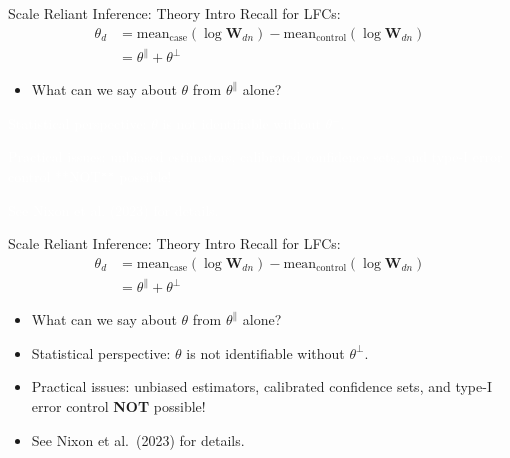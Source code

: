\documentclass[
  ignorenonframetext,
]{beamer}
\providecommand{\tightlist}{%
  \setlength{\itemsep}{0pt}\setlength{\parskip}{0pt}}
\begin{document}
\begin{frame}{Scale Reliant Inference: Theory Intro}
\protect\hypertarget{scale-reliant-inference-theory-intro}{}
Recall for LFCs: \begin{align*}
\theta_d &= \text{mean}_{\text{case}}(\log \mathbf{W}_{dn} ) - \text{mean}_{\text{control}}(\log \mathbf{W}_{dn} )\\
&= \theta^\parallel + \theta^\perp
\end{align*}

\begin{itemize}
\tightlist
\item
  What can we say about \(\theta\) from \(\theta^\parallel\) alone?
\end{itemize}

\textcolor{white}{Statistical perspective: $\theta$ is not identifiable without $\theta^\perp$.}

\textcolor{white}{Practical issues: unbiased estimators, calibrated confidence sets, and type-I error control **NOT** possible!}

\textcolor{white}{See Nixon et al. (2023) for details.}
\end{frame}

\begin{frame}{Scale Reliant Inference: Theory Intro}
\protect\hypertarget{scale-reliant-inference-theory-intro-1}{}
Recall for LFCs: \begin{align*}
\theta_d &= \text{mean}_{\text{case}}(\log \mathbf{W}_{dn} ) - \text{mean}_{\text{control}}(\log \mathbf{W}_{dn} )\\
&= \theta^\parallel + \theta^\perp
\end{align*}

\begin{itemize}
\item
  What can we say about \(\theta\) from \(\theta^\parallel\) alone?
\item
  Statistical perspective: \(\theta\) is not identifiable without
  \(\theta^\perp\).
\item
  Practical issues: unbiased estimators, calibrated confidence sets, and
  type-I error control \textbf{NOT} possible!
\item
  See Nixon et al.~(2023) for details.
\end{itemize}
\end{frame}
\end{document}
